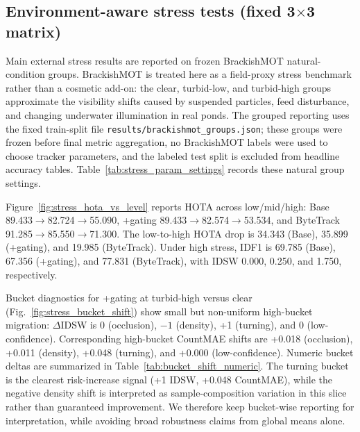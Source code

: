 \documentclass[5p,twocolumn,a4paper]{elsarticle}
\begin{document}
\subsection{Environment-aware stress tests (fixed 3$\times$3 matrix)}
Main external stress results are reported on frozen BrackishMOT natural-condition groups. BrackishMOT is treated here as a field-proxy stress benchmark rather than a cosmetic add-on: the clear, turbid-low, and turbid-high groups approximate the visibility shifts caused by suspended particles, feed disturbance, and changing underwater illumination in real ponds. The grouped reporting uses the fixed train-split file \texttt{results/brackishmot\_groups.json}; these groups were frozen before final metric aggregation, no BrackishMOT labels were used to choose tracker parameters, and the labeled test split is excluded from headline accuracy tables. Table~\ref{tab:stress_param_settings} records these natural group settings.

Figure~\ref{fig:stress_hota_vs_level} reports HOTA across low/mid/high: Base 89.433$\rightarrow$82.724$\rightarrow$55.090, +gating 89.433$\rightarrow$82.574$\rightarrow$53.534, and ByteTrack 91.285$\rightarrow$85.550$\rightarrow$71.300. The low-to-high HOTA drop is 34.343 (Base), 35.899 (+gating), and 19.985 (ByteTrack). Under high stress, IDF1 is 69.785 (Base), 67.356 (+gating), and 77.831 (ByteTrack), with IDSW 0.000, 0.250, and 1.750, respectively.

Bucket diagnostics for +gating at turbid-high versus clear (Fig.~\ref{fig:stress_bucket_shift}) show small but non-uniform high-bucket migration: $\Delta$IDSW is 0 (occlusion), $-1$ (density), +1 (turning), and 0 (low-confidence). Corresponding high-bucket CountMAE shifts are +0.018 (occlusion), +0.011 (density), +0.048 (turning), and +0.000 (low-confidence). Numeric bucket deltas are summarized in Table~\ref{tab:bucket_shift_numeric}. The turning bucket is the clearest risk-increase signal (+1 IDSW, +0.048 CountMAE), while the negative density shift is interpreted as sample-composition variation in this slice rather than guaranteed improvement. We therefore keep bucket-wise reporting for interpretation, while avoiding broad robustness claims from global means alone.

\begin{table}[t]
\centering
\caption{Numeric bucket-risk migration for +gating under BrackishMOT turbid-high stress (relative to clean).}
\label{tab:bucket_shift_numeric}

\end{table}
\end{document}
